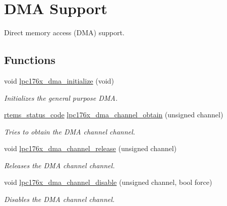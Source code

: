 \hypertarget{group__lpc176x__dma}{}\section{D\+MA Support}
\label{group__lpc176x__dma}


Direct memory access (D\+MA) support.  


\subsection*{Functions}
\begin{DoxyCompactItemize}
\item 
\mbox{\label{group__lpc176x__dma_gad363140b7213af48d12114d7b123696b}} 
void \mbox{\hyperlink{group__lpc176x__dma_gad363140b7213af48d12114d7b123696b}{lpc176x\+\_\+dma\+\_\+initialize}} (void)
\begin{DoxyCompactList}\small\item\em Initializes the general purpose D\+MA. \end{DoxyCompactList}\item 
\mbox{\hyperlink{group__ClassicStatus_ga545d41846817eaba6143d52ee4d9e9fe}{rtems\+\_\+status\+\_\+code}} \mbox{\hyperlink{group__lpc176x__dma_ga32b8827ab8510db23366a72bb43e966a}{lpc176x\+\_\+dma\+\_\+channel\+\_\+obtain}} (unsigned channel)
\begin{DoxyCompactList}\small\item\em Tries to obtain the D\+MA channel {\itshape channel}. \end{DoxyCompactList}\item 
void \mbox{\hyperlink{group__lpc176x__dma_ga85bf518adad1282447ab02fa735d8003}{lpc176x\+\_\+dma\+\_\+channel\+\_\+release}} (unsigned channel)
\begin{DoxyCompactList}\small\item\em Releases the D\+MA channel {\itshape channel}. \end{DoxyCompactList}\item 
void \mbox{\hyperlink{group__lpc176x__dma_ga9733b723623ac327f3ead7ec4d563309}{lpc176x\+\_\+dma\+\_\+channel\+\_\+disable}} (unsigned channel, bool force)
\begin{DoxyCompactList}\small\item\em Disables the D\+MA channel {\itshape channel}. \end{DoxyCompactList}\item 
\mbox{\label{group__lpc176x__dma_gae3d1abdc654dedfca37c801a8031348b}} 

\end{DoxyCompactItemize}

